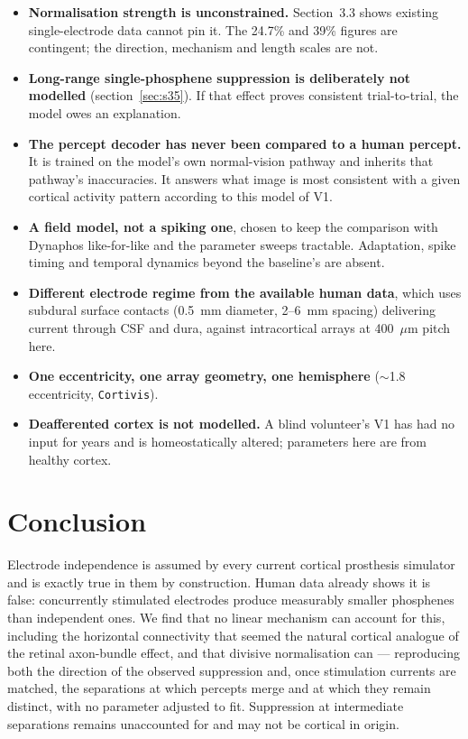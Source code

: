 \documentclass[10pt,twocolumn]{article}
\newcommand{\um}{\ensuremath{\mu\text{m}}}
\begin{document}
\begin{itemize}[leftmargin=1.1em,itemsep=0.2em,topsep=0.2em]
\item \textbf{Normalisation strength is unconstrained.} Section~3.3 shows
  existing single-electrode data cannot pin it. The 24.7\% and 39\% figures
  are contingent; the direction, mechanism and length scales are not.
\item \textbf{Long-range single-phosphene suppression is deliberately not
  modelled} (section~\ref{sec:s35}). If that effect proves consistent
  trial-to-trial, the model owes an explanation.
\item \textbf{The percept decoder has never been compared to a human
  percept.} It is trained on the model's own normal-vision pathway and
  inherits that pathway's inaccuracies. It answers what image is most
  consistent with a given cortical activity pattern according to this model
  of V1.
\item \textbf{A field model, not a spiking one}, chosen to keep the
  comparison with Dynaphos like-for-like and the parameter sweeps
  tractable. Adaptation, spike timing and temporal dynamics beyond the
  baseline's are absent.
\item \textbf{Different electrode regime from the available human data},
  which uses subdural surface contacts (0.5~mm diameter, 2--6~mm spacing)
  delivering current through CSF and dura, against intracortical arrays at
  400~\um{} pitch here.
\item \textbf{One eccentricity, one array geometry, one hemisphere}
  ($\sim$1.8\textdegree{} eccentricity, \texttt{Cortivis}).
\item \textbf{Deafferented cortex is not modelled.} A blind volunteer's V1
  has had no input for years and is homeostatically altered; parameters
  here are from healthy cortex.
\end{itemize}

\section{Conclusion}

Electrode independence is assumed by every current cortical prosthesis
simulator and is exactly true in them by construction. Human data already
shows it is false: concurrently stimulated electrodes produce measurably
smaller phosphenes than independent ones. We find that no linear mechanism
can account for this, including the horizontal connectivity that seemed the
natural cortical analogue of the retinal axon-bundle effect, and that
divisive normalisation can --- reproducing both the direction of the
observed suppression and, once stimulation currents are matched, the
separations at which percepts merge and at which they remain distinct, with
no parameter adjusted to fit. Suppression at intermediate separations
remains unaccounted for and may not be cortical in origin.
\end{document}
